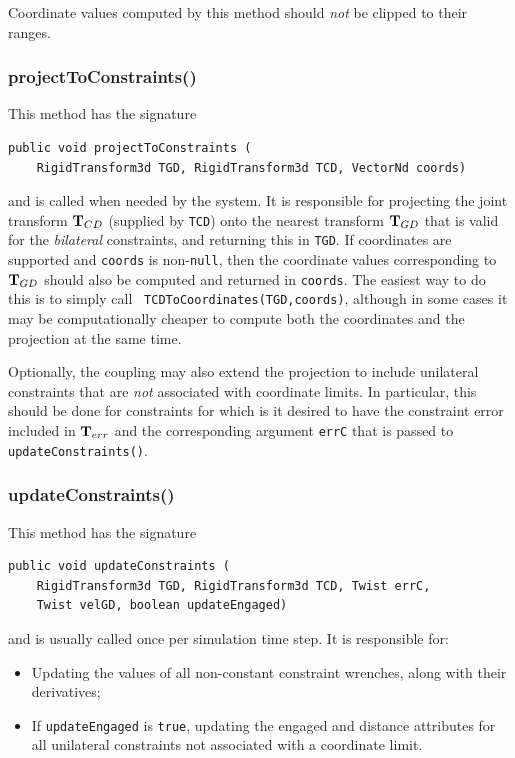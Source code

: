 \begin{sideblock}
Coordinate values computed by this method should {\it not} be clipped
to their ranges.
\end{sideblock}

\subsubsection*{projectToConstraints()}

This method has the signature
%
\begin{lstlisting}[]
  public void projectToConstraints (
    RigidTransform3d TGD, RigidTransform3d TCD, VectorNd coords)
\end{lstlisting}
%
and is called when needed by the system. It is responsible for
projecting the joint transform ${\bf T}_{CD}$ (supplied by {\tt TCD}) onto
the nearest transform ${\bf T}_{GD}$ that is valid for the {\it bilateral}
constraints, and returning this in {\tt TGD}.  If coordinates are
supported and {\tt coords} is non-{\tt null}, then the coordinate
values corresponding to ${\bf T}_{GD}$ should also be computed and returned
in {\tt coords}. The easiest way to do this is to simply call {\tt
TCDToCoordinates(TGD,coords)}, although in some cases it may be
computationally cheaper to compute both the coordinates and the
projection at the same time.

Optionally, the coupling may also extend the projection to include
unilateral constraints that are {\it not} associated with coordinate
limits. In particular, this should be done for constraints for which
is it desired to have the constraint error included in ${\bf T}_{err}$ and
the corresponding argument {\tt errC} that is passed to {\tt
updateConstraints()}.

\subsubsection*{updateConstraints()}

This method has the signature
%
\begin{lstlisting}[]
  public void updateConstraints (
    RigidTransform3d TGD, RigidTransform3d TCD, Twist errC,
    Twist velGD, boolean updateEngaged)
\end{lstlisting}
%
and is usually called once per simulation time step. It is responsible
for:

\begin{itemize}

\item Updating the values of all non-constant constraint wrenches,
along with their derivatives;

\item If {\tt updateEngaged} is {\tt true}, updating the {\sf engaged}
and {\sf distance} attributes for all unilateral constraints not
associated with a coordinate limit.

\end{itemize}

